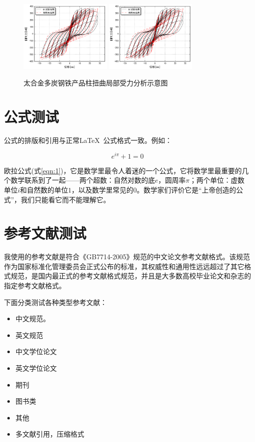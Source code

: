 \documentclass{bjtu-bachelor-thesis}
\begin{document}
\begin{figure}
    \centering
    {\includegraphics[width=0.4\textwidth]{pic/G1.png}}
    {\includegraphics[width=0.4\textwidth]{pic/G1.png}}
    \caption{太合金多炭钢铁产品柱扭曲局部受力分析示意图}\label{fig:2}
\end{figure}

\section{公式测试}
公式的排版和引用与正常\LaTeX\ 公式格式一致。例如：

\begin{equation}
    \label{eqn:1}
    e^{i\pi}+1=0
\end{equation}

欧拉公式(式\ref{eqn:1})，它是数学里最令人着迷的一个公式，它将数学里最重要的几个数学联系到了一起——两个超数：自然对数的底$e$，圆周率$\pi$；两个单位：虚数单位$i$和自然数的单位$1$，以及数学里常见的$0$。数学家们评价它是“上帝创造的公式”，我们只能看它而不能理解它。

\section{参考文献测试}
我使用的参考文献是符合《GB7714-2005》规范的中文论文参考文献格式。该规范作为国家标准化管理委员会正式公布的标准，其权威性和通用性远远超过了其它格式规范，是国内最正式的参考文献格式规范，并且是大多数高校毕业论文和杂志的指定参考文献格式。

下面分类测试各种类型参考文献：

\begin{itemize}
    \item 中文规范\citep{C1}。
    \item 英文规范\citep{ACI318}
    \item 中文学位论文\citep{liguiqian}
    \item 英文学位论文\citep{bentz2000}
    \item 期刊\citep{FMK}
    \item 图书类\citep{B1}
    \item 其他\citep{R1}
    \item 多文献引用，压缩格式\citep{C1,ACI318,liguiqian,R1}
\end{itemize}
\end{document}

